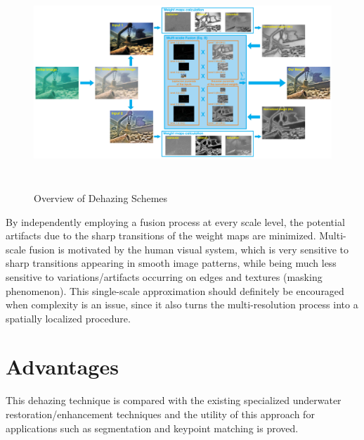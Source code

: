\documentclass[hidelinks, 12pt]{report}
\begin{document}
\begin{figure}[H]
\centering
\includegraphics[width=16cm,height=8cm]{Dehaze.png}
\caption[Overview of Dehazing Schemes]{Overview of Dehazing Schemes}
\label{Dehazing}
\end{figure}
By independently employing a fusion process at every scale level, the potential artifacts due to the sharp transitions of the weight maps are minimized. Multi-scale fusion is motivated by the human visual system, which is very sensitive to sharp transitions appearing in smooth image patterns, while being much less sensitive to variations/artifacts occurring on edges and textures (masking phenomenon). This single-scale approximation should definitely be encouraged when complexity is an issue, since it also turns the multi-resolution process into a spatially localized procedure.

\chapter{Advantages}
This dehazing technique is compared with the existing specialized underwater restoration/enhancement techniques and the utility of this approach for applications such as segmentation and keypoint matching is proved.
\end{document}
